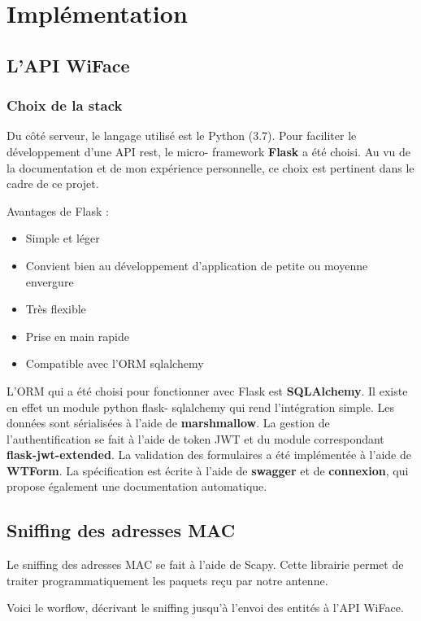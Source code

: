 \chapter{Implémentation}
\label{ch:implémentation}

\section{L'API WiFace}

\subsection{Choix de la stack}

Du côté serveur, le langage utilisé est le Python (3.7). Pour faciliter le développement d’une API rest, le micro-
framework \textbf{Flask} a été choisi. Au vu de la documentation et de mon expérience personnelle, ce choix est pertinent
dans le cadre de ce projet.

Avantages de Flask :
\begin{itemize}
\item Simple et léger
\item Convient bien au développement d’application de petite ou moyenne envergure
\item Très flexible
\item Prise en main rapide
\item Compatible avec l’ORM sqlalchemy
\end{itemize}

L’ORM qui a été choisi pour fonctionner avec Flask est \textbf{SQLAlchemy}. Il existe en effet un module python flask-
sqlalchemy qui rend l’intégration simple.
Les données sont sérialisées à l’aide de \textbf{marshmallow}.
La gestion de l’authentification se fait à l’aide de token JWT et du module correspondant \textbf{flask-jwt-extended}.
La validation des formulaires a été implémentée à l'aide de \textbf{WTForm}.
La spécification est écrite à l’aide de \textbf{swagger} et de \textbf{connexion}, qui propose également une documentation automatique.

\section{Sniffing des adresses MAC}

Le sniffing des adresses MAC se fait à l'aide de Scapy.
Cette librairie permet de traiter programmatiquement les paquets
reçu par notre antenne. 

Voici le worflow, décrivant le sniffing jusqu'à l'envoi 
des entités à l'API WiFace. 

